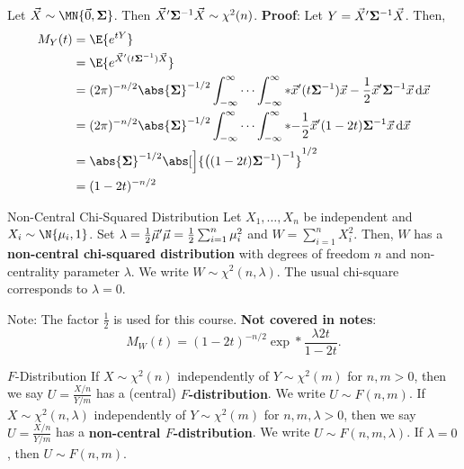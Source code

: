 \begin{Theorem}{}{}
    Let $ \Vector{X}\sim \MN{\Vector{0},\Matrix{\Sigma}} $. Then $ \vec{X}'\mathbf{\Sigma}^{-1}\vec{X}\sim \chi^2(n) $.
    \tcblower{}
    \textbf{Proof}:
    Let $ Y=\vec{X}'\mathbf{\Sigma}^{-1}\vec{X} $. Then,
    \begin{align*}
        M_Y(t)
         & =\E{e^{tY}}                                                                                                              \\
         & =\E{e^{\Vector{X}'(t \Matrix{\Sigma}^{-1})\Vector{X}}}                                                                   \\
         & =(2\pi)^{-n/2}\abs{\Matrix{\Sigma}}^{-1/2}\int_{-\infty}^{\infty}\cdots\int_{-\infty}^{\infty}
        \exp*{\Vector{x}'(t \Matrix{\Sigma}^{-1})\Vector{x}-\frac{1}{2}\Vector{x}' \Matrix{\Sigma}^{-1}\Vector{x}}\odif{\Vector{x}} \\
         & =(2\pi)^{-n/2}\abs{\Matrix{\Sigma}}^{-1/2}\int_{-\infty}^{\infty}\cdots\int_{-\infty}^{\infty}
        \exp*{-\frac{1}{2}\Vector{x}'(1-2t)\Matrix{\Sigma}^{-1}\Vector{x}}\odif{\Vector{x}}                                         \\
         & =\abs{\Matrix{\Sigma}}^{-1/2}\abs[\Big]{\bigl((1-2t)\Matrix{\Sigma}^{-1}\bigr)^{-1}}^{1/2}                               \\
         & =(1-2t)^{-n/2}
    \end{align*}
\end{Theorem}
\begin{Remark}{Non-Central Chi-Squared Distribution}{}
    Let $ X_1,\ldots,X_n $ be independent and $ X_i \sim \N{\mu_i,1} $. Set $ \lambda=\frac{1}{2}\vec{\mu}'\vec{\mu}=\frac{1}{2}\sum_{i=1}^{n}\mu_i^2 $
    and $ W=\sum_{i=1}^{n}X_i^2 $. Then, $ W $ has a \textbf{non-central chi-squared distribution}
    with degrees of freedom $ n $ and non-centrality parameter
    $ \lambda $. We write $ W \sim \chi^2(n,\lambda) $.
    The usual chi-square corresponds to $ \lambda=0 $.

    Note: The factor $ \frac{1}{2} $ is used for this course.
    \tcblower{}
    \textbf{Not covered in notes}:
    \[ M_W(t)=(1-2t)^{-n/2}\exp*{\frac{\lambda 2t}{1-2t}}. \]
\end{Remark}
\begin{Remark}{$F$-Distribution}{}
    If $ X \sim \chi^2(n) $ independently of $ Y \sim \chi^2(m) $
    for $ n,m>0 $, then
    we say $ U=\frac{X/n}{Y/m} $ has a (central) \textbf{$F$-distribution}.
    We write $ U \sim F(n,m) $.
    \tcblower{}
    If $ X \sim \chi^2(n,\lambda) $ independently of $ Y \sim \chi^2(m) $
    for $ n,m,\lambda>0 $, then we say
    $ U=\frac{X/n}{Y/m} $ has a \textbf{non-central $F$-distribution}.
    We write $ U \sim F(n,m,\lambda) $. If $ \lambda=0 $, then
    $ U \sim F(n,m) $.
\end{Remark}
